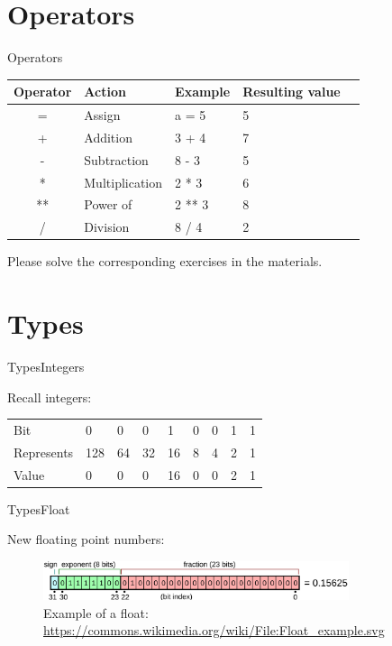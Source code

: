 \documentclass[aspectratio=169]{beamer}
\begin{document}
\section{Operators}
\begin{frame}{Operators}
\begin{tabular}{cllll}
\toprule
	Operator & Action & Example & Resulting value \\
\midrule
	= & Assign & a = 5 & 5\\
	+ & Addition & 3 + 4 & 7 \\
	- & Subtraction & 8 - 3 & 5 \\
	* & Multiplication & 2 * 3 & 6 \\
	** & Power of & 2 ** 3 & 8 \\
	/ & Division & 8 / 4 & 2 \\
\bottomrule
\end{tabular}

\pause
\vspace{2em}

Please solve the corresponding exercises in the materials.
\end{frame}

\section{Types}
\begin{frame}{Types}{Integers}

Recall integers:

\centering
\begin{tabular}{lllllllll}
	\toprule
	Bit        & 0   & 0  & 0  & 1  & 0 & 0 & 1 & 1 \\
	Represents & 128 & 64 & 32 & 16 & 8 & 4 & 2 & 1 \\ 
	Value      & 0   & 0  & 0  & 16 & 0 & 0 & 2 & 1 \\
	\midrule
\end{tabular}
\end{frame}

\begin{frame}{Types}{Float}

New floating point numbers:

\begin{figure}
	\centering
	\includegraphics[width=0.8\textwidth]{img/Float.png}
	\caption{Example of a float: \url{https://commons.wikimedia.org/wiki/File:Float_example.svg}}
\end{figure}
\end{frame}
\end{document}

